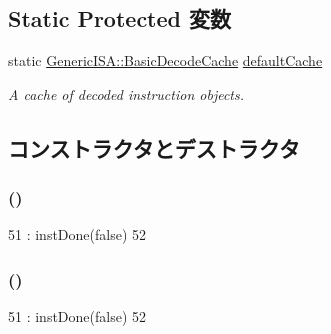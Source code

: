 \subsection*{Static Protected 変数}
\begin{DoxyCompactItemize}
\item 
static \hyperlink{classGenericISA_1_1BasicDecodeCache}{GenericISA::BasicDecodeCache} \hyperlink{classMipsISA_1_1Decoder_abbd53aa079e76dea4263764f171d9cc0}{defaultCache}
\begin{DoxyCompactList}\small\item\em A cache of decoded instruction objects. \item\end{DoxyCompactList}\end{DoxyCompactItemize}


\subsection{コンストラクタとデストラクタ}
\hypertarget{classMipsISA_1_1Decoder_aedfa2b7d97ed17b14903ed75d6214c78}{
\subsubsection[{Decoder}]{ ()}}
\label{classMipsISA_1_1Decoder_aedfa2b7d97ed17b14903ed75d6214c78}



\begin{DoxyCode}
51               : instDone(false)
52     {}
\end{DoxyCode}
\hypertarget{classMipsISA_1_1Decoder_aedfa2b7d97ed17b14903ed75d6214c78}{
\subsubsection[{Decoder}]{ ()}}
\label{classMipsISA_1_1Decoder_aedfa2b7d97ed17b14903ed75d6214c78}



\begin{DoxyCode}
51               : instDone(false)
52     {}
\end{DoxyCode}



